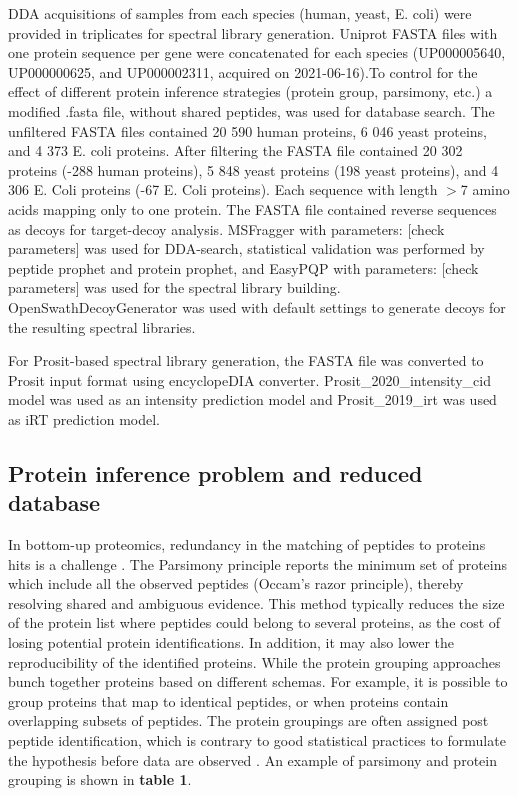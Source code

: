 \documentclass[10pt,letterpaper]{article}
\begin{document}
DDA acquisitions of samples from each species (human, yeast, E. coli) were provided in triplicates for spectral library generation. Uniprot FASTA files with one protein sequence per gene were concatenated for each species (UP000005640, UP000000625, and UP000002311, acquired on 2021-06-16).To control for the effect of different protein inference strategies (protein group, parsimony, etc.) a modified .fasta file, without shared peptides, was used for database search. The unfiltered FASTA files contained 20 590 human proteins, 6 046 yeast proteins, and 4 373 E. coli proteins. After filtering the FASTA file contained 20 302 proteins (-288 human proteins), 5 848 yeast proteins (198 yeast proteins), and 4 306 E. Coli proteins (-67 E. Coli proteins). Each sequence with length $>$7 amino acids mapping only to one protein. The FASTA file contained reverse sequences as decoys for target-decoy analysis. MSFragger with parameters: [check parameters] was used for DDA-search, statistical validation was performed by peptide prophet and protein prophet, and EasyPQP with parameters: [check parameters] was used for the spectral library building. OpenSwathDecoyGenerator was used with default settings to generate decoys for the resulting spectral libraries.  

For Prosit-based spectral library generation, the FASTA file was converted to Prosit input format using encyclopeDIA converter. Prosit\_2020\_intensity\_cid model was used as an intensity prediction model and Prosit\_2019\_irt was used as iRT prediction model.  


\subsection*{Protein inference problem and reduced database}

In bottom-up proteomics, redundancy in the matching of peptides to proteins hits is a challenge \cite{nesvizhskii2005interpretation}. The Parsimony principle reports the minimum set of proteins which include all the observed peptides (Occam's razor principle), thereby resolving shared and ambiguous evidence. This method typically reduces the size of the protein list where peptides could belong to several proteins, as the cost of losing potential protein identifications. In addition, it may also lower the reproducibility of the identified proteins\cite{serang2012recognizing}. While the protein grouping approaches bunch together proteins based on different schemas. For example, it is possible to group proteins that map to identical peptides, or when proteins contain overlapping subsets of peptides. The protein groupings are often assigned post peptide identification, which is contrary to good statistical practices to formulate the hypothesis before data are observed \cite{serang2012recognizing}. An example of parsimony and protein grouping is shown in \textbf{table 1}. 
\end{document}
